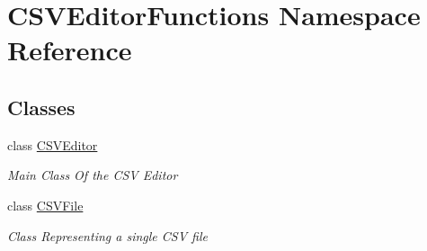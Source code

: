 \hypertarget{namespace_c_s_v_editor_functions}{}\section{C\+S\+V\+Editor\+Functions Namespace Reference}
\label{namespace_c_s_v_editor_functions}
\subsection*{Classes}
\begin{DoxyCompactItemize}
\item 
class \mbox{\hyperlink{class_c_s_v_editor_functions_1_1_c_s_v_editor}{C\+S\+V\+Editor}}
\begin{DoxyCompactList}\small\item\em Main Class Of the C\+SV Editor \end{DoxyCompactList}\item 
class \mbox{\hyperlink{class_c_s_v_editor_functions_1_1_c_s_v_file}{C\+S\+V\+File}}
\begin{DoxyCompactList}\small\item\em Class Representing a single C\+SV file \end{DoxyCompactList}\end{DoxyCompactItemize}
